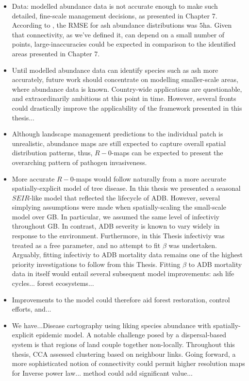 \begin{itemize}
    \item Data: modelled abundance data is not accurate enough to make such detailed, fine-scale management decisions, as presented in Chapter 7. According to \cite{hill.data},
    the RMSE for ash abundance distributions was $5\mathrm{ha}$. Given that connectivity, as we've defined it, can depend on a small number of points,
    large-inaccuracies could be expected in comparison to the identified areas presented in Chapter 7.
    \item Until modelled abundance data can identify species such as ash more accurately, future work should concentrate on modelling smaller-scale areas, 
    where abundance data is known. Country-wide applications are questionable, and extraordinarily ambitious at this point in time. However, several fronts could drastically improve the applicability of the framework presented in this thesis...
    \item Although landscape management predictions to the individual patch is unrealistic, abundance maps are still expected to capture overall spatial distribution patterns,
    thus, $R-0$-maps can be expected to present the overarching pattern of pathogen invasiveness.
    \item More accurate $R-0$-maps would follow naturally from a more accurate spatially-explicit model of tree disease. In this thesis we presented a seasonal $SEIR$-like model 
    that reflected the lifecycle of ADB. However, several simplying assumptions were made when spatially-scaling the small-scale model over GB.
    In particular, we assumed the same level of infectiviy throughout GB. In contrast, ADB severity is known to vary widely in response to the environment.
    Furthermore, in this Thesis infectiviy was treated as a free parameter, and no attempt to fit $\beta$ was undertaken.
    Arguably, fitting infectiviy to ADB mortality data remains one of the highest priority investigations to follow from this Thesis.
    Fitting $\beta$ to ADB mortality data in itself would entail several subsequent model improvements: ash life cycles... forest ecosystems...
    \item Improvements to the model could therefore aid forest restoration, control efforts, and...
    \item We have...Disease cartography using liking species abundance with spatially-explicit epidemic model. A notable challenge posed by a dispersal-based system
    is that regions of land couple together non-locally. Throughout this thesis, CCA assessed clustering based on neighbour links. 
    Going forward, a more sophisticated notion of connectivity could permit higher resolution maps for Inverse power law... method could add significant value... 
    
\end{itemize}
